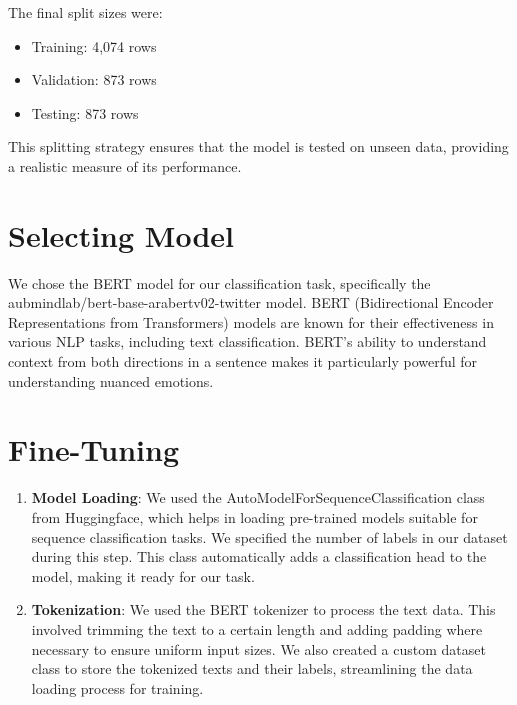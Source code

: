 The final split sizes were:
\begin{itemize}
    \item Training: 4,074 rows
    \item Validation: 873 rows
    \item Testing: 873 rows
\end{itemize}

This splitting strategy ensures that the model is tested on unseen data, providing a realistic measure of its performance.

\section{Selecting Model}
We chose the BERT model for our classification task, specifically the {aubmindlab/bert-base-arabertv02-twitter} model. BERT (Bidirectional Encoder Representations from Transformers) models are known for their effectiveness in various NLP tasks, including text classification. BERT's ability to understand context from both directions in a sentence makes it particularly powerful for understanding nuanced emotions.

\section{Fine-Tuning}
\begin{enumerate}
    \item \textbf{Model Loading}: We used the {AutoModelForSequenceClassification} class from Huggingface, which helps in loading pre-trained models suitable for sequence classification tasks. We specified the number of labels in our dataset during this step. This class automatically adds a classification head to the model, making it ready for our task.
    \item \textbf{Tokenization}: We used the BERT tokenizer to process the text data. This involved trimming the text to a certain length and adding padding where necessary to ensure uniform input sizes. We also created a custom dataset class to store the tokenized texts and their labels, streamlining the data loading process for training.
\end{enumerate}

